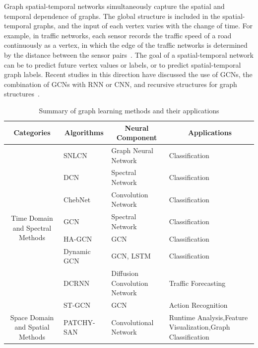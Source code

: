 Graph spatial-temporal networks simultaneously capture the spatial and temporal dependence of graphs. The global structure is included in the spatial-temporal graphs, and the input of each vertex varies with the change of time. For example, in traffic networks, each sensor records the traffic speed of a road continuously as a vertex, in which the edge of the traffic networks is determined by the distance between the sensor pairs~. The goal of a spatial-temporal network can be to predict future vertex values or labels, or to predict spatial-temporal graph labels. Recent studies in this direction have discussed the use of GCNs, the combination of GCNs with RNN or CNN, and recursive structures for graph structures~.
\begin{table}[htbp]
  \centering
  \caption{Summary of graph learning methods and their applications}
    \begin{tabular}{clll}
    \toprule
    \textbf{Categories} & \multicolumn{1}{c}{\textbf{Algorithms}} & \multicolumn{1}{c}{\textbf{Neural Component}} & \multicolumn{1}{c}{\textbf{Applications}} \\
    \midrule
    \multicolumn{1}{c}{\multirow{8}[16]{*}{Time Domain and\newline{} Spectral Methods}}
                       & SNLCN~ & Graph Neural Network &
                       Classification\\
\cmidrule{2-4}          & DCN~ & Spectral Network  & Classification \\
\cmidrule{2-4}          & ChebNet~ & Convolution Network & Classification \\
\cmidrule{2-4}          & GCN~ & Spectral Network  & Classification \\
\cmidrule{2-4}          & HA-GCN~ & GCN   & Classification \\
\cmidrule{2-4}          & Dynamic GCN~ & GCN, LSTM & Classification \\
\cmidrule{2-4}          & DCRNN~ & Diffusion Convolution Network & Traffic Forecasting \\
\cmidrule{2-4}          & ST-GCN ~ & GCN   & Action Recognition \\
    \midrule
    \multicolumn{1}{c}{\multirow{7}[14]{*}{Space Domain and\newline{} Spatial Methods}} & PATCHY-SAN~ & Convolutional Network & \multicolumn{1}{p{11.94em}}{Runtime Analysis,\newline{}Feature Visualization,\newline{}Graph Classification} \\

\end{tabular}
\end{table}
